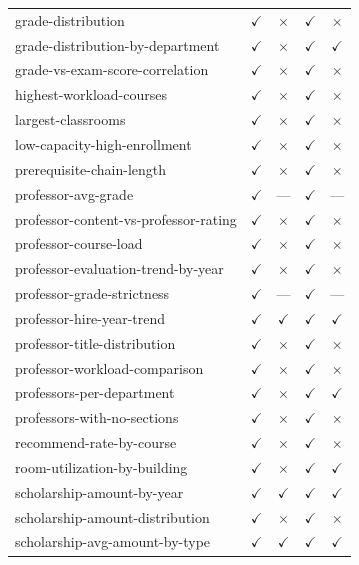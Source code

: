 \begin{longtable}{lcccc}
grade-distribution & $\checkmark$ & $\times$ & $\checkmark$ & $\times$ \\
grade-distribution-by-department & $\checkmark$ & $\times$ & $\checkmark$ & $\checkmark$ \\
grade-vs-exam-score-correlation & $\checkmark$ & $\times$ & $\checkmark$ & $\times$ \\
highest-workload-courses & $\checkmark$ & $\times$ & $\checkmark$ & $\times$ \\
largest-classrooms & $\checkmark$ & $\times$ & $\checkmark$ & $\times$ \\
low-capacity-high-enrollment & $\checkmark$ & $\times$ & $\checkmark$ & $\times$ \\
prerequisite-chain-length & $\checkmark$ & $\times$ & $\checkmark$ & $\times$ \\
professor-avg-grade & $\checkmark$ & --- & $\checkmark$ & --- \\
professor-content-vs-professor-rating & $\checkmark$ & $\times$ & $\checkmark$ & $\times$ \\
professor-course-load & $\checkmark$ & $\times$ & $\checkmark$ & $\times$ \\
professor-evaluation-trend-by-year & $\checkmark$ & $\times$ & $\checkmark$ & $\times$ \\
professor-grade-strictness & $\checkmark$ & --- & $\checkmark$ & --- \\
professor-hire-year-trend & $\checkmark$ & $\checkmark$ & $\checkmark$ & $\checkmark$ \\
professor-title-distribution & $\checkmark$ & $\times$ & $\checkmark$ & $\times$ \\
professor-workload-comparison & $\checkmark$ & $\times$ & $\checkmark$ & $\times$ \\
professors-per-department & $\checkmark$ & $\times$ & $\checkmark$ & $\checkmark$ \\
professors-with-no-sections & $\checkmark$ & $\times$ & $\checkmark$ & $\times$ \\
recommend-rate-by-course & $\checkmark$ & $\times$ & $\checkmark$ & $\times$ \\
room-utilization-by-building & $\checkmark$ & $\times$ & $\checkmark$ & $\checkmark$ \\
scholarship-amount-by-year & $\checkmark$ & $\checkmark$ & $\checkmark$ & $\checkmark$ \\
scholarship-amount-distribution & $\checkmark$ & $\times$ & $\checkmark$ & $\times$ \\
scholarship-avg-amount-by-type & $\checkmark$ & $\checkmark$ & $\checkmark$ & $\checkmark$ \\

\end{longtable}
